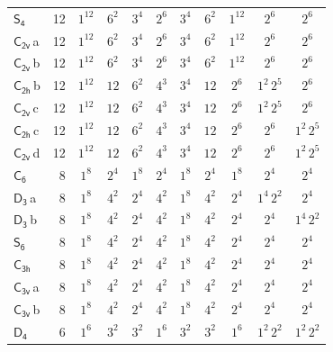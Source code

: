 \documentclass[10pt,a4paper]{article}
\numberwithin{equation}{section}
\newcommand{\grp}[1]{\mathsf{#1}}
\newcommand{\clsletter}[1]{\,{\scriptsize\color{black!55}#1}}
\begin{document}
{\begin{longtable}{@{}lrccccccccc@{}}
\href{S4.pdf}{$\grp{S_{4}}$} & 12 & $1^{12}$ & $6^{2}$ & $3^{4}$ & $2^{6}$ & $3^{4}$ & $6^{2}$ & $1^{12}$ & $2^{6}$ & $2^{6}$\\
\href{C2v.pdf}{$\grp{C_{2v}}$}\clsletter{a} & 12 & $1^{12}$ & $6^{2}$ & $3^{4}$ & $2^{6}$ & $3^{4}$ & $6^{2}$ & $1^{12}$ & $2^{6}$ & $2^{6}$\\
\href{C2v.pdf}{$\grp{C_{2v}}$}\clsletter{b} & 12 & $1^{12}$ & $6^{2}$ & $3^{4}$ & $2^{6}$ & $3^{4}$ & $6^{2}$ & $1^{12}$ & $2^{6}$ & $2^{6}$\\
\href{C2h.pdf}{$\grp{C_{2h}}$}\clsletter{b} & 12 & $1^{12}$ & $12$ & $6^{2}$ & $4^{3}$ & $3^{4}$ & $12$ & $2^{6}$ & $1^{2}\,2^{5}$ & $2^{6}$\\
\href{C2v.pdf}{$\grp{C_{2v}}$}\clsletter{c} & 12 & $1^{12}$ & $12$ & $6^{2}$ & $4^{3}$ & $3^{4}$ & $12$ & $2^{6}$ & $1^{2}\,2^{5}$ & $2^{6}$\\
\href{C2h.pdf}{$\grp{C_{2h}}$}\clsletter{c} & 12 & $1^{12}$ & $12$ & $6^{2}$ & $4^{3}$ & $3^{4}$ & $12$ & $2^{6}$ & $2^{6}$ & $1^{2}\,2^{5}$\\
\href{C2v.pdf}{$\grp{C_{2v}}$}\clsletter{d} & 12 & $1^{12}$ & $12$ & $6^{2}$ & $4^{3}$ & $3^{4}$ & $12$ & $2^{6}$ & $2^{6}$ & $1^{2}\,2^{5}$\\
\href{C6.pdf}{$\grp{C_{6}}$} & 8 & $1^{8}$ & $2^{4}$ & $1^{8}$ & $2^{4}$ & $1^{8}$ & $2^{4}$ & $1^{8}$ & $2^{4}$ & $2^{4}$\\
\href{D3.pdf}{$\grp{D_{3}}$}\clsletter{a} & 8 & $1^{8}$ & $4^{2}$ & $2^{4}$ & $4^{2}$ & $1^{8}$ & $4^{2}$ & $2^{4}$ & $1^{4}\,2^{2}$ & $2^{4}$\\
\href{D3.pdf}{$\grp{D_{3}}$}\clsletter{b} & 8 & $1^{8}$ & $4^{2}$ & $2^{4}$ & $4^{2}$ & $1^{8}$ & $4^{2}$ & $2^{4}$ & $2^{4}$ & $1^{4}\,2^{2}$\\
\href{S6.pdf}{$\grp{S_{6}}$} & 8 & $1^{8}$ & $4^{2}$ & $2^{4}$ & $4^{2}$ & $1^{8}$ & $4^{2}$ & $2^{4}$ & $2^{4}$ & $2^{4}$\\
\href{C3h.pdf}{$\grp{C_{3h}}$} & 8 & $1^{8}$ & $4^{2}$ & $2^{4}$ & $4^{2}$ & $1^{8}$ & $4^{2}$ & $2^{4}$ & $2^{4}$ & $2^{4}$\\
\href{C3v.pdf}{$\grp{C_{3v}}$}\clsletter{a} & 8 & $1^{8}$ & $4^{2}$ & $2^{4}$ & $4^{2}$ & $1^{8}$ & $4^{2}$ & $2^{4}$ & $2^{4}$ & $2^{4}$\\
\href{C3v.pdf}{$\grp{C_{3v}}$}\clsletter{b} & 8 & $1^{8}$ & $4^{2}$ & $2^{4}$ & $4^{2}$ & $1^{8}$ & $4^{2}$ & $2^{4}$ & $2^{4}$ & $2^{4}$\\
\href{D4.pdf}{$\grp{D_{4}}$} & 6 & $1^{6}$ & $3^{2}$ & $3^{2}$ & $1^{6}$ & $3^{2}$ & $3^{2}$ & $1^{6}$ & $1^{2}\,2^{2}$ & $1^{2}\,2^{2}$\\

\end{longtable}}
\end{document}
